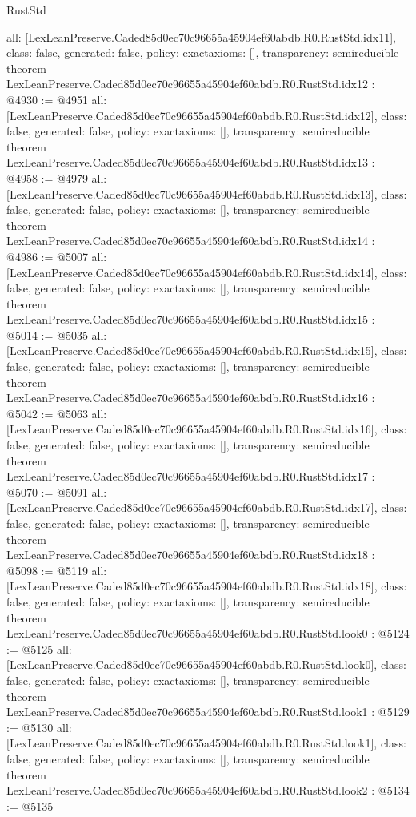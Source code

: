 \begin{lexlean}{RustStd}
\begin{coremodule}
{  all: [LexLeanPreserve.Caded85d0ec70c96655a45904ef60abdb.R0.RustStd.idx11],
  class: false,
  generated: false,
  policy: exact{axioms: []},
  transparency: semireducible
}
theorem LexLeanPreserve.Caded85d0ec70c96655a45904ef60abdb.R0.RustStd.idx12 : @4930 := @4951 {
  all: [LexLeanPreserve.Caded85d0ec70c96655a45904ef60abdb.R0.RustStd.idx12],
  class: false,
  generated: false,
  policy: exact{axioms: []},
  transparency: semireducible
}
theorem LexLeanPreserve.Caded85d0ec70c96655a45904ef60abdb.R0.RustStd.idx13 : @4958 := @4979 {
  all: [LexLeanPreserve.Caded85d0ec70c96655a45904ef60abdb.R0.RustStd.idx13],
  class: false,
  generated: false,
  policy: exact{axioms: []},
  transparency: semireducible
}
theorem LexLeanPreserve.Caded85d0ec70c96655a45904ef60abdb.R0.RustStd.idx14 : @4986 := @5007 {
  all: [LexLeanPreserve.Caded85d0ec70c96655a45904ef60abdb.R0.RustStd.idx14],
  class: false,
  generated: false,
  policy: exact{axioms: []},
  transparency: semireducible
}
theorem LexLeanPreserve.Caded85d0ec70c96655a45904ef60abdb.R0.RustStd.idx15 : @5014 := @5035 {
  all: [LexLeanPreserve.Caded85d0ec70c96655a45904ef60abdb.R0.RustStd.idx15],
  class: false,
  generated: false,
  policy: exact{axioms: []},
  transparency: semireducible
}
theorem LexLeanPreserve.Caded85d0ec70c96655a45904ef60abdb.R0.RustStd.idx16 : @5042 := @5063 {
  all: [LexLeanPreserve.Caded85d0ec70c96655a45904ef60abdb.R0.RustStd.idx16],
  class: false,
  generated: false,
  policy: exact{axioms: []},
  transparency: semireducible
}
theorem LexLeanPreserve.Caded85d0ec70c96655a45904ef60abdb.R0.RustStd.idx17 : @5070 := @5091 {
  all: [LexLeanPreserve.Caded85d0ec70c96655a45904ef60abdb.R0.RustStd.idx17],
  class: false,
  generated: false,
  policy: exact{axioms: []},
  transparency: semireducible
}
theorem LexLeanPreserve.Caded85d0ec70c96655a45904ef60abdb.R0.RustStd.idx18 : @5098 := @5119 {
  all: [LexLeanPreserve.Caded85d0ec70c96655a45904ef60abdb.R0.RustStd.idx18],
  class: false,
  generated: false,
  policy: exact{axioms: []},
  transparency: semireducible
}
theorem LexLeanPreserve.Caded85d0ec70c96655a45904ef60abdb.R0.RustStd.look0 : @5124 := @5125 {
  all: [LexLeanPreserve.Caded85d0ec70c96655a45904ef60abdb.R0.RustStd.look0],
  class: false,
  generated: false,
  policy: exact{axioms: []},
  transparency: semireducible
}
theorem LexLeanPreserve.Caded85d0ec70c96655a45904ef60abdb.R0.RustStd.look1 : @5129 := @5130 {
  all: [LexLeanPreserve.Caded85d0ec70c96655a45904ef60abdb.R0.RustStd.look1],
  class: false,
  generated: false,
  policy: exact{axioms: []},
  transparency: semireducible
}
theorem LexLeanPreserve.Caded85d0ec70c96655a45904ef60abdb.R0.RustStd.look2 : @5134 := @5135 {
}
\end{coremodule}
\end{lexlean}
